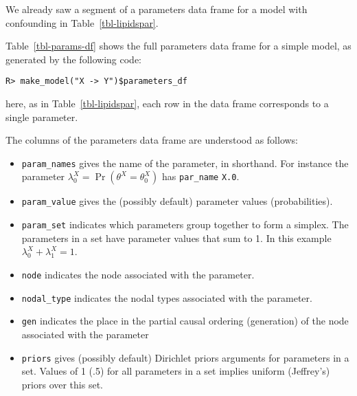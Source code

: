 \documentclass[
  11pt,
  article]{jss}
\providecommand{\tightlist}{%
  \setlength{\itemsep}{0pt}\setlength{\parskip}{0pt}}\usepackage{longtable,booktabs,array}
\begin{document}
We already saw a segment of a parameters data frame for a model with
confounding in Table~\ref{tbl-lipidspar}.

Table~\ref{tbl-params-df} shows the full parameters data frame for a
simple model, as generated by the following code:

\begin{verbatim}
R> make_model("X -> Y")$parameters_df
\end{verbatim}

\hypertarget{tbl-params-df}{}
\begin{table}[H]
\caption{\label{tbl-params-df}Example of Parameters Data Frame. }\tabularnewline

\centering
{}
\end{table}

here, as in Table~\ref{tbl-lipidspar}, each row in the data frame
corresponds to a single parameter.

The columns of the parameters data frame are understood as follows:

\begin{itemize}
\tightlist
\item
  \texttt{param\_names} gives the name of the parameter, in shorthand.
  For instance the parameter
  \(\lambda^X_0 = \Pr(\theta^X = \theta^X_0)\) has \texttt{par\_name}
  \texttt{X.0}.
\item
  \texttt{param\_value} gives the (possibly default) parameter values
  (probabilities).
\item
  \texttt{param\_set} indicates which parameters group together to form
  a simplex. The parameters in a set have parameter values that sum to
  1. In this example \(\lambda^X_0 + \lambda^X_1 = 1\).
\item
  \texttt{node} indicates the node associated with the parameter.
\item
  \texttt{nodal\_type} indicates the nodal types associated with the
  parameter.
\item
  \texttt{gen} indicates the place in the partial causal ordering
  (generation) of the node associated with the parameter
\item
  \texttt{priors} gives (possibly default) Dirichlet priors arguments
  for parameters in a set. Values of 1 (.5) for all parameters in a set
  implies uniform (Jeffrey's) priors over this set.
\end{itemize}
\end{document}
